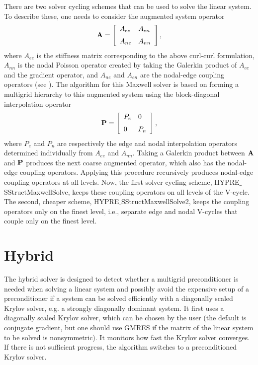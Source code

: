 There are two solver cycling schemes that can be used to solve the linear system. To describe these, one
needs to consider the augmented system operator
\begin{eqnarray}
\bf{A}= \left [
  \begin{array}{ll}
     A_{ee} & A_{en}  \\ \rule{0cm}{.5cm}
     A_{ne} & A_{nn}
  \end{array}
\right ],
\end{eqnarray}
where $A_{ee}$ is the stiffness matrix corresponding to the above curl-curl formulation, $A_{nn}$
is the nodal Poisson operator created by taking the Galerkin product of $A_{ee}$ and the gradient operator,
and $A_{ne}$ and $A_{en}$ are the nodal-edge coupling operators (see \cite{JonesLee_2006}). The algorithm
for this Maxwell solver is based on forming a multigrid hierarchy to this augmented system using the block-diagonal
interpolation operator 
\begin{eqnarray*}
\bf{P}= \left[  \begin{array}{ll}
            P_e & 0  \\ \rule{0cm}{.5cm}
            0   & P_n
         \end{array}
\right],
\end{eqnarray*}
where $P_e$ and $P_n$ are respectively the edge and nodal interpolation operators determined individually
from $A_{ee}$ and $A_{nn}.$ Taking a Galerkin product between $\bf{A}$ and $\bf{P}$ produces the next coarse
augmented operator, which also has the nodal-edge coupling operators. Applying this procedure recursively
produces nodal-edge coupling operators at all levels. Now, the first solver cycling scheme,
HYPRE$\_$SStructMaxwellSolve, keeps these coupling operators on all levels of the V-cycle. The second,
cheaper scheme, HYPRE$\_$SStructMaxwellSolve2, keeps the coupling operators only on the finest level, i.e.,
separate edge and nodal V-cycles that couple only on the finest level.



\section{Hybrid}

The hybrid solver is designed to detect whether a multigrid preconditioner
is needed when solving a linear system and possibly avoid the expensive setup
of a preconditioner if a system can be solved efficiently with a diagonally
scaled Krylov solver, e.g. a strongly diagonally dominant system. 
It first uses a diagonally scaled Krylov solver, which can be chosen by the user
(the default is conjugate gradient, but one should use GMRES if the matrix of the 
linear system to be solved is nonsymmetric). It monitors how fast the Krylov solver
converges.
If there is not sufficient progress, the algorithm switches to a preconditioned
Krylov solver.

